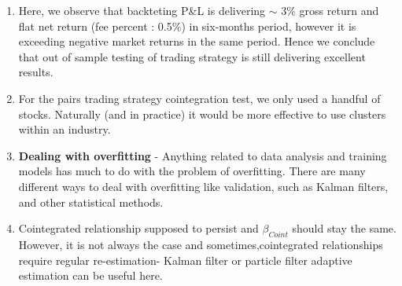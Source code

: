 \documentclass[a4paper, 11pt]{article}
\begin{document}
\begin{enumerate}

\item  Here, we observe that backteting P\&L is delivering $\sim$ 3\% gross return and flat net return (fee percent : 0.5\%) in six-months period, however it is exceeding negative market returns in the same period. Hence we conclude that out of sample testing of trading strategy is still delivering excellent results.
\item For the pairs trading strategy cointegration test, we only used a handful of stocks. Naturally (and in practice) it would be more effective to use clusters within an industry.
\item \textbf{Dealing with overfitting} - Anything related to data analysis and training models has much to do with the problem of overfitting. There are many different ways to deal with overfitting like validation, such as Kalman filters, and other statistical methods.
\item Cointegrated relationship supposed to persist and $\beta_{Coint}$ should stay the same. However, it is not always the case and sometimes,cointegrated relationships require regular re-estimation- Kalman filter or particle filter adaptive estimation can be useful here.

\end{enumerate}
\end{document}
